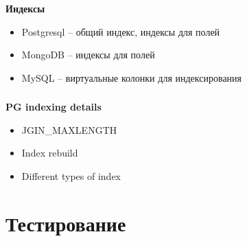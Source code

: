 \documentclass[usenames,dvipsnames, 18pt, compress, aspectratio=169]{beamer}
\begin{document}
\begin{frame}
    \frametitle{}
    \textbf{Индексы}
    \begin{center}
        \begin{itemize}[label={\MVRightarrow}]
            \item Postgresql -- общий индекс, индексы для полей
            \item MongoDB -- индексы для полей
            \item MySQL -- виртуальные колонки для индексирования
        \end{itemize}
    \end{center}
\end{frame}

\begin{frame}
    \frametitle{}
    \textbf{PG indexing details}
    \begin{center}
        \begin{itemize}[label={\MVRightarrow}]
            \item JGIN\_MAXLENGTH
            \item Index rebuild
            \item Different types of index
        \end{itemize}
    \end{center}
\end{frame}

\fontsize{13pt}{14}\selectfont
\section{Тестирование}
\fontsize{17pt}{18}\selectfont

%
\begin{frame}
    \frametitle{}
\end{frame}
\end{document}
